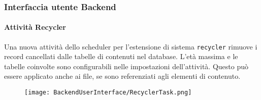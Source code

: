 \begin{frame}[fragile]
	\frametitle{Interfaccia utente Backend}
	\framesubtitle{Attività Recycler}

	Una nuova attività dello scheduler per l'estensione di sistema \texttt{recycler} rimuove i
	record cancellati dalle tabelle di contenuti nel database. L'età massima e le tabelle coinvolte
	sono configurabili nelle impostazioni dell'attività.
	Questo può essere applicato anche ai file, se sono referenziati agli elementi di contenuto.

	\begin{figure}
		\texttt{[image: BackendUserInterface/RecyclerTask.png]}
	\end{figure}

\end{frame}

